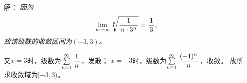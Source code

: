 
\titlepage




\begin{frame}
	\linespread{1.5}
	
	\bigskip
	
	\small 解：\it
	因为
	$$\limn\sqrt[n]{\df1{n\cdot 3^n}}=\df13,$$
	故该级数的收敛区间为$(-3,3)$。
	
	又$x=3$时，级数为$\sumn\df1n$，发散；
	$x=-3$时，级数为$\sumn\df{(-1)^n}n$，收敛。
	故所求收敛域为$[-3,3)$。
\end{frame}

